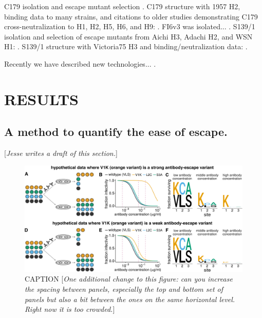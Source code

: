 \documentclass[11pt]{article}
\newcommand{\comment}[1]{{\color{red}[\textsl{#1}]}}
\begin{document}
C179 isolation and escape mutant selection \cite{okuno1993common}.
C179 structure with 1957 H2, binding data to many strains, and citations to older studies demonstrating C179 cross-neutralization to H1, H2, H5, H6, and H9:  \cite{dreyfus2013structure}.
FI6v3 was isolated... \cite{corti2011neutralizing}.
S139/1 isolation and selection of escape mutants from Aichi H3, Adachi H2, and WSN H1: \cite{yoshida2009cross}.
S139/1 structure with Victoria75 H3 and binding/neutralization data: \cite{lee2012heterosubtypic}.

Recently we have described new technologies... \cite{doud2017complete, dingens2017comprehensive}.


\section*{RESULTS}

\subsection*{A method to quantify the ease of escape.}
\comment{Jesse writes a draft of this section.}
\begin{figure}
\centerline{\includegraphics[width=\textwidth]{figs/fracsurvive_example/fracsurvive_fig.pdf}}
\caption{\label{fig:fracsurvive_example}
CAPTION
\comment{One additional change to this figure: can you increase the spacing between panels, especially the top and bottom set of panels but also a bit between the ones on the same horizontal level. Right now it is too crowded.}
}
\end{figure}
\end{document}
